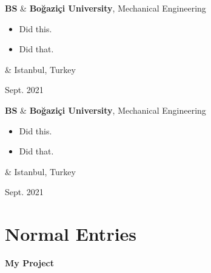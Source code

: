 \documentclass[10pt, letterpaper]{article}
\newenvironment{highlights}{
        \begin{itemize}[
                topsep=0pt,
                parsep=0.10 cm,
                partopsep=0pt,
                itemsep=0pt,
                after=\vspace{-1\baselineskip},
                leftmargin=0.4 cm + 3pt
            ]
    }{
        \end{itemize}
    } %
\let\originalTabularx\tabularx
\let\originalEndTabularx\endtabularx
\renewenvironment{tabularx}{\bgroup\centering\originalTabularx}{\originalEndTabularx\par\egroup}
\begin{document}
        \vspace{0.2 cm}
        \begin{tabularx}{
            \textwidth-0.4 cm-0.13cm
        }{
            L{0.85cm}
            K{0.2 cm}
            R{4.1 cm}
        }
            \textbf{BS}
            &
            \textbf{Boğaziçi University}, Mechanical Engineering

            \vspace{0.10 cm}

            \begin{highlights}
                \item Did this.
                \item Did that.
            \end{highlights}
            &
            Istanbul, Turkey

            Sept. 2021
        \end{tabularx}

        \vspace{0.2 cm}
        \begin{tabularx}{
            \textwidth-0.4 cm-0.13cm
        }{
            L{0.85cm}
            K{0.2 cm}
            R{4.1 cm}
        }
            \textbf{BS}
            &
            \textbf{Boğaziçi University}, Mechanical Engineering

            \vspace{0.10 cm}

            \begin{highlights}
                \item Did this.
                \item Did that.
            \end{highlights}
            &
            Istanbul, Turkey

            Sept. 2021
        \end{tabularx}


    
    \section{Normal Entries}

        \begin{tabularx}{
            \textwidth-0.4 cm-0.13cm
        }{
            K{0.2 cm}
        }
            \textbf{My Project}

            \vspace{0.10 cm}

        \end{tabularx}
\end{document}
